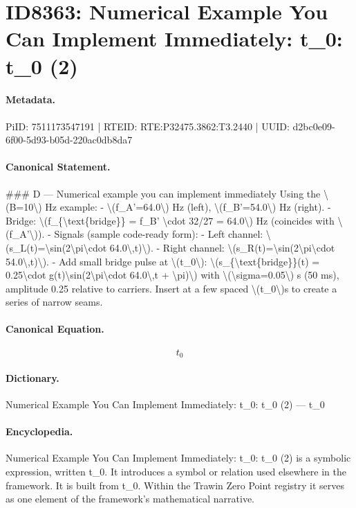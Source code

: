 \section*{ID8363: Numerical Example You Can Implement Immediately: t\_0: t\_0 (2)}
\paragraph{Metadata.}
PiID: 7511173547191 | RTEID: RTE:P32475.3862:T3.2440 | UUID: d2bc0e09-6f00-5d93-b05d-220ac0db8da7

\paragraph{Canonical Statement.}
\#\#\# D — Numerical example you can implement immediately Using the \textbackslash{}(B=10\textbackslash{}) Hz example: - \textbackslash{}(f\_A'=64.0\textbackslash{}) Hz (left), \textbackslash{}(f\_B'=54.0\textbackslash{}) Hz (right). - Bridge: \textbackslash{}(f\_\{\textbackslash{}text\{bridge\}\} = f\_B' \textbackslash{}cdot 32/27 = 64.0\textbackslash{}) Hz (coincides with \textbackslash{}(f\_A'\textbackslash{})). - Signals (sample code-ready form): - Left channel: \textbackslash{}(s\_L(t)=\textbackslash{}sin(2\textbackslash{}pi\textbackslash{}cdot 64.0\textbackslash{},t)\textbackslash{}). - Right channel: \textbackslash{}(s\_R(t)=\textbackslash{}sin(2\textbackslash{}pi\textbackslash{}cdot 54.0\textbackslash{},t)\textbackslash{}). - Add small bridge pulse at \textbackslash{}(t\_0\textbackslash{}): \textbackslash{}(s\_\{\textbackslash{}text\{bridge\}\}(t) = 0.25\textbackslash{}cdot g(t)\textbackslash{}sin(2\textbackslash{}pi\textbackslash{}cdot 64.0\textbackslash{},t + \textbackslash{}pi)\textbackslash{}) with \textbackslash{}(\textbackslash{}sigma=0.05\textbackslash{}) s (50 ms), amplitude 0.25 relative to carriers. Insert at a few spaced \textbackslash{}(t\_0\textbackslash{})s to create a series of narrow seams.

\paragraph{Canonical Equation.}
\[
t_0
\]

\paragraph{Dictionary.}
Numerical Example You Can Implement Immediately: t\_0: t\_0 (2) — t\_0

\paragraph{Encyclopedia.}
Numerical Example You Can Implement Immediately: t\_0: t\_0 (2) is a symbolic expression, written t\_0. It introduces a symbol or relation used elsewhere in the framework. It is built from t\_0. Within the Trawin Zero Point registry it serves as one element of the framework's mathematical narrative.
